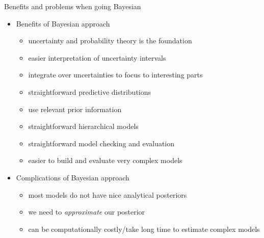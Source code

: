 \documentclass[10pt]{beamer}
\begin{document}


\begin{frame}{Benefits and problems when going Bayesian}

  \begin{itemize}
  \item Benefits of Bayesian approach
    \begin{itemize}
    \item uncertainty and probability theory is the foundation
    \item easier interpretation of uncertainty intervals
    \item integrate over uncertainties to focus to interesting parts
    \item straightforward predictive distributions
    \item use relevant prior information
    \item straightforward hierarchical models
    \item straightforward model checking and evaluation
    \item easier to build and evaluate very complex models
    \end{itemize}
    \pause
  \item Complications of Bayesian approach
    \begin{itemize}
    \item most models do not have nice analytical posteriors
    \item we need to \emph{approximate} our posterior
    \item can be computationally costly/take long time to estimate complex models
    \end{itemize}
  \end{itemize}
\end{frame}
\end{document}
